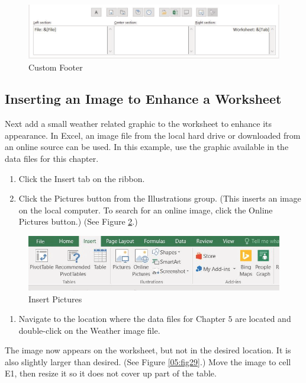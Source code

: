 \begin{figure}[H]
	\centering
	\includegraphics[width=\maxwidth{.95\linewidth}]{gfx/ch05_fig27}
	\caption{Custom Footer}
	\label{05:fig27}
\end{figure}

\subsection{Inserting an Image to Enhance a Worksheet}

Next add a small weather related graphic to the worksheet to enhance its appearance. In Excel, an image file from the local hard drive or downloaded from an online source can be used. In this example, use the graphic available in the data files for this chapter.

\begin{enumerate}
	\item Click the Insert tab on the ribbon.
	\item Click the Pictures button from the Illustrations group. (This inserts an image on the local computer. To search for an online image, click the Online Pictures button.) (See Figure \ref{05:fig28}.)
\end{enumerate}

\begin{figure}[H]
	\centering
	\includegraphics[width=\maxwidth{.95\linewidth}]{gfx/ch05_fig28}
	\caption{Insert Pictures}
	\label{05:fig28}
\end{figure}

\begin{enumerate}[resume]
	\item Navigate to the location where the data files for Chapter $ 5 $ are located and double-click on the Weather image file.
\end{enumerate}

The image now appears on the worksheet, but not in the desired location. It is also slightly larger than desired. (See Figure \ref{05:fig29}.) Move the image to cell E1, then resize it so it does not cover up part of the table.

